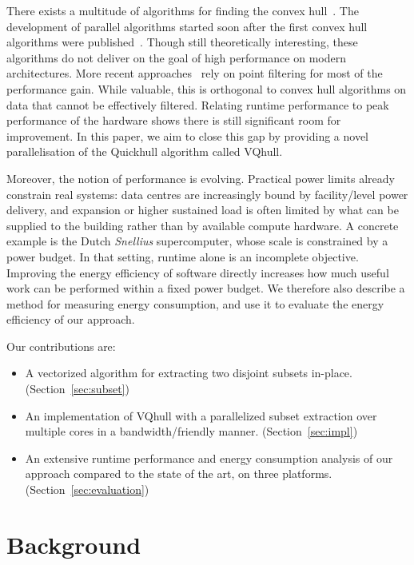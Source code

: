 \documentclass[11pt,a4paper]{article}
\begin{document}
There exists a multitude of algorithms for finding the convex hull~\cite{graham1972efficient,jarvis1973identification,eddy1977convex,preparata1977convex,bykat1978convex,akl1978fast,andrew1979another,clarkson1993four,barber1996quick,chan1996optimal}.
The development of parallel algorithms started soon after the first convex hull algorithms were published~\cite{nath1981parallel}.
Though still theoretically interesting, these algorithms do not deliver on the goal of high performance on modern architectures.
More recent approaches~\cite{masnadi2020concurrent} rely on point filtering for most of the performance gain.
While valuable, this is orthogonal to convex hull algorithms on data that cannot be effectively filtered.
Relating runtime performance to peak performance of the hardware shows there is still significant room for improvement.
In this paper, we aim to close this gap by providing a novel parallelisation of the Quickhull algorithm called VQhull.

Moreover, the notion of performance is evolving.
Practical power limits already constrain real systems: data centres are increasingly bound by facility\-/level power delivery, and expansion or higher sustained load is often limited by what can be supplied to the building rather than by available compute hardware.
A concrete example is the Dutch \emph{Snellius} supercomputer, whose scale is constrained by a power budget.
In that setting, runtime alone is an incomplete objective.
Improving the energy efficiency of software directly increases how much useful work can be performed within a fixed power budget.
We therefore also describe a method for measuring energy consumption, and use it to evaluate the energy efficiency of our approach.

Our contributions are:
\begin{itemize}
  \item A vectorized algorithm for extracting two disjoint subsets in-place.
  (Section~\ref{sec:subset})
  \item An implementation of VQhull with a parallelized subset extraction over multiple cores in a bandwidth\-/friendly manner.
  (Section~\ref{sec:impl})
  \item An extensive runtime performance and energy consumption analysis of our approach compared to the state of the art, on three platforms.
  (Section~\ref{sec:evaluation})
\end{itemize}

\section{Background}
\end{document}
